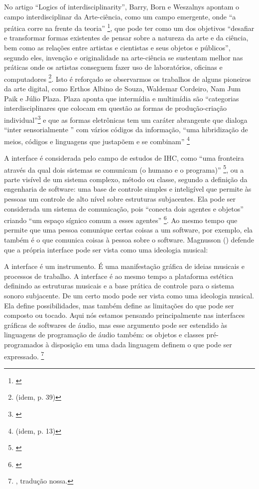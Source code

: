 No artigo ``Logics of interdisciplinarity'', Barry, Born e Weszalnys apontam o campo interdisciplinar da Arte-ciência, como um campo emergente, onde ``a prática corre na frente da teoria'' \footnote{\cite{Barry2008}}, que pode ter como um dos objetivos ``desafiar e transformar formas existentes de pensar sobre a natureza da arte e da ciência, bem como as relações entre artistas e cientistas e seus objetos e públicos'', segundo eles, invenção e originalidade na arte-ciência se sustentam melhor nas práticas onde os artistas conseguem fazer uso de laboratórios, oficinas e computadores \footnote{(idem, p. 39)}. Isto é reforçado se observarmos os trabalhos de alguns pioneiros da arte digital, como Erthos Albino de Souza, Waldemar Cordeiro, Nam Jum Paik e Júlio Plaza. Plaza aponta que intermídia e multimídia são ``categorias interdisciplinares  que colocam em questão as formas de produção-criação individual''\footnote{\cite[66]{JulioPlaza1969}} e que as formas eletrônicas tem um caráter abrangente que dialoga ``inter sensorialmente '' com vários códigos da informação, ``uma hibridização de meios, códigos e linguagens que justapõem e se combinam'' \footnote{(idem, p. 13)}



A interface é considerada pelo campo de estudos de IHC, como “uma fronteira através da qual dois sistemas se comunicam (o humano e o programa)” \footnote{\cite{Magnusson2005}}, ou a parte visível de um sistema complexo, método ou classe, segundo a definição da engenharia de software: uma base de controle simples e inteligível que permite às pessoas um controle de alto nível sobre estruturas subjacentes. Ela pode ser considerada um sistema de comunicação, pois “conecta dois agentes e objetos” criando “um espaço sígnico comum a esses agentes” \footnote{\cite[105]{IAZZETTA1997}}. Ao mesmo tempo que permite que uma pessoa comunique certas coisas a um software, por exemplo, ela também é o que comunica coisas à pessoa sobre o software. Magnusson (\citeyear{Magnusson2005}) defende que a própria interface pode ser vista como uma ideologia musical: 

\begin{citacao}
A interface é um instrumento. É uma manifestação gráfica de ideias musicais e processos de trabalho. A interface é ao mesmo tempo a plataforma estética definindo as estruturas musicais e a base prática de controle para o sistema sonoro subjacente. De um certo modo pode ser vista como uma ideologia musical. Ela define possibilidades, mas também define as limitações do que pode ser composto ou tocado. Aqui nós estamos pensando principalmente nas interfaces gráficas de softwares de áudio, mas esse argumento pode ser estendido às linguagens de programação de áudio também: os objetos e classes pré-programados à disposição em uma dada linguagem definem o que pode ser expressado. \footnote{\cite[212]{Magnusson2005}, tradução nossa.}
\end{citacao}


